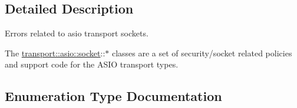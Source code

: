 \subsection{Detailed Description}
Errors related to asio transport sockets. 

The \hyperlink{namespacewebsocketpp_1_1transport_1_1asio_1_1socket}{transport\+::asio\+::socket}\+:\+:$\ast$ classes are a set of security/socket related policies and support code for the A\+S\+I\+O transport types. 

\subsection{Enumeration Type Documentation}
\hypertarget{namespacewebsocketpp_1_1transport_1_1asio_1_1socket_1_1error_a828ddaa5ed63a761e1b557465a35f05a}{}
